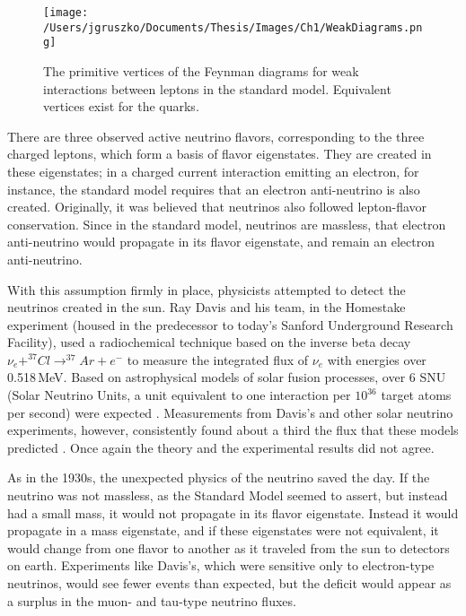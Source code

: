 \begin{figure}[h]
\hfil \texttt{[image: /Users/jgruszko/Documents/Thesis/Images/Ch1/WeakDiagrams.png]} \hfil
\caption[Feynman diagrams for the weak interactions]{The primitive vertices of the Feynman diagrams for weak interactions between leptons in the standard model. Equivalent vertices exist for the quarks. \cite{PDG2014}}
\label{weak_diagrams}
\end{figure}

There are three observed active neutrino flavors, corresponding to the three charged leptons, which form a basis of flavor eigenstates. They are created in these eigenstates; in a charged current interaction emitting an electron, for instance, the standard model requires that an electron anti-neutrino is also created. Originally, it was believed that neutrinos also followed lepton-flavor conservation. Since in the standard model, neutrinos are massless, that electron anti-neutrino would propagate in its flavor eigenstate, and remain an electron anti-neutrino. 

With this assumption firmly in place, physicists attempted to detect the neutrinos created in the sun. Ray Davis and his team, in the Homestake experiment (housed in the predecessor to today's Sanford Underground Research Facility), used a radiochemical technique based on the inverse beta decay $\nu_{e} + ^{37}Cl \rightarrow ^{37}Ar + e^-$ to measure the integrated flux of $\nu_e$ with energies over 0.518\,MeV. Based on astrophysical models of solar fusion processes, over 6 SNU (Solar Neutrino Units, a unit equivalent to one interaction per $10^{36}$ target atoms per second) were expected \cite{TurckChieze1993} \cite{Bahcall1995}. Measurements from Davis's and other solar neutrino experiments, however, consistently found about a third the flux that these models predicted \cite{Davis1998}. Once again the theory and the experimental results did not agree.

As in the 1930s, the unexpected physics of the neutrino saved the day. If the neutrino was not massless, as the Standard Model seemed to assert, but instead had a small mass, it would not propagate in its flavor eigenstate. Instead it would propagate in a mass eigenstate, and if these eigenstates were not equivalent, it would change from one flavor to another as it traveled from the sun to detectors on earth. Experiments like Davis's, which were sensitive only to electron-type neutrinos, would see fewer events than expected, but the deficit would appear as a surplus in the muon- and tau-type neutrino fluxes. 

